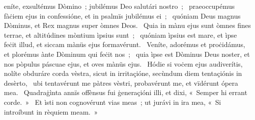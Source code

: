 { }
{%
eníte, exsultémus Dòmino~; jubilémus Deo salutári nostro~; 
~praeoccupémus fàċiem ejus in confessióne, et in psalmïs jubilémus ei~; 
~quóniam Deus magnus Dòminus, et Rex magnus super òmnes Deos. 
~Quia in mànu ejus sunt òmnes fines terrae, et altitúdines mòntium ìpsius sunt~; 
~quóniam ìpsius est mare, et ìpse feċit illud, et siccam mànüs ejus formavérunt. 
~Veníte, adorémus et proċidámus, et plorémus ànte Dòminum qui feċit nos~; 
~quia ìpse est Dòminus Deus noster, et nos pòpulus páscuae ejus, et oves mànüs ejus. 
~Hódie si voċem ejus audiverítis, nolíte obduráre corda vèstra, sicut in irritaçióne, secùndum diem tentaçiónis in desèrto, 
~ubi tentavérunt me pàtres vèstri, probavérunt me, et vïdérunt ópera mea. 
~Quadraġìnta annïs offènsus fui ġeneraçióni illi, et dixi, «~Semper hi errant corde.~»
~Et ìsti non cognovérunt vias meas~; ut jurávi in ira mea, «~Si introíbunt in rèquiem meam.~»
}
